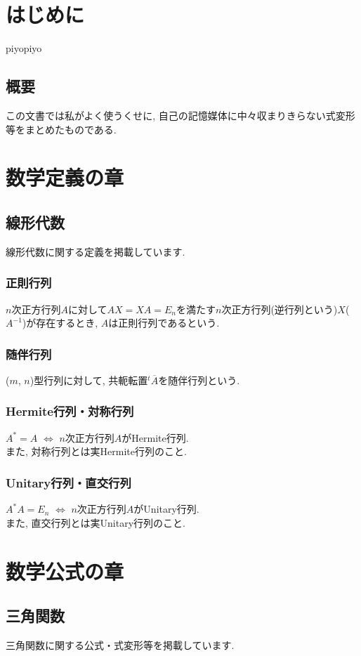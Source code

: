 \documentclass[a4paper]{report}
\begin{document}
\part{はじめに}
piyopiyo
\chapter{概要}
この文書では私がよく使うくせに, 自己の記憶媒体に中々収まりきらない式変形等をまとめたものである.

\part{数学定義の章}
\chapter{線形代数}
線形代数に関する定義を掲載しています.
\section{正則行列}
$n$次正方行列$A$に対して$AX=XA=E_n$を満たす$n$次正方行列(逆行列という)$X$($A^{-1}$)が存在するとき, $A$は正則行列であるという.

\section{随伴行列}
($m$, $n$)型行列に対して, 共軛転置${}^{t}\overline{A}$を随伴行列という.

\section{Hermite行列・対称行列}
$A^*=A$ $\Leftrightarrow$ $n$次正方行列$A$がHermite行列.\\
また, 対称行列とは実Hermite行列のこと.

\section{Unitary行列・直交行列}
$A^*A=E_n$ $\Leftrightarrow$ $n$次正方行列$A$がUnitary行列.\\
また, 直交行列とは実Unitary行列のこと.

\part{数学公式の章}
\chapter{三角関数}
三角関数に関する公式・式変形等を掲載しています.
\end{document}
